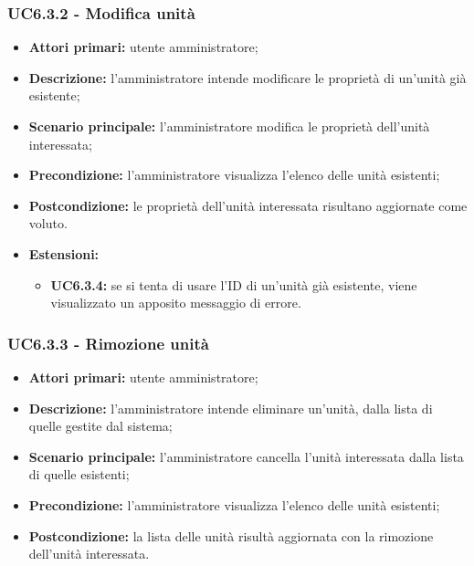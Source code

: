 \subsubsection{UC6.3.2 - Modifica unità}
\begin{itemize}
	\item \textbf{Attori primari:} utente amministratore;
	\item \textbf{Descrizione:} l'amministratore intende modificare le proprietà di un'unità già esistente;
	\item \textbf{Scenario principale:} l'amministratore modifica le proprietà dell'unità interessata;
	\item \textbf{Precondizione:} l'amministratore visualizza l'elenco delle unità esistenti;
	\item \textbf{Postcondizione:} le proprietà dell'unità interessata risultano aggiornate come voluto.
	\item \textbf{Estensioni:}
	\begin{itemize}
		\item \textbf{UC6.3.4:} se si tenta di usare l'ID di un'unità già esistente, viene visualizzato un apposito messaggio di errore.
	\end{itemize}
\end{itemize}

\subsubsection{UC6.3.3 - Rimozione unità}
\begin{itemize}
	\item \textbf{Attori primari:} utente amministratore;
	\item \textbf{Descrizione:} l'amministratore intende eliminare un'unità, dalla lista di quelle gestite dal sistema;
	\item \textbf{Scenario principale:} l'amministratore cancella l'unità interessata dalla lista di quelle esistenti;
	\item \textbf{Precondizione:} l'amministratore visualizza l'elenco delle unità esistenti;
	\item \textbf{Postcondizione:} la lista delle unità risultà aggiornata con la rimozione dell'unità interessata.
\end{itemize}

